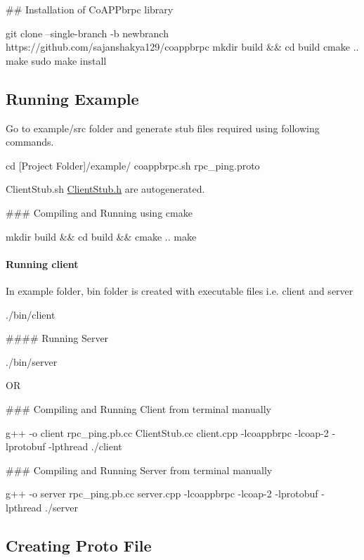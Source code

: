 \#\# Installation of Co\+A\+P\+Pbrpc library 
\begin{DoxyCode}
git clone --single-branch -b newbranch https://github.com/sajanshakya129/coappbrpc
mkdir build && cd build
cmake ..
make
sudo make install
\end{DoxyCode}


\subsection*{Running Example}

Go to example/src folder and generate stub files required using following commands. 
\begin{DoxyCode}
cd [Project Folder]/example/
coappbrpc.sh rpc\_ping.proto
\end{DoxyCode}
 Client\+Stub.\+sh \hyperlink{ClientStub_8h_source}{Client\+Stub.\+h} are autogenerated.

\#\#\# Compiling and Running using cmake 
\begin{DoxyCode}
mkdir build && cd build && cmake ..
make
\end{DoxyCode}
 \paragraph*{Running client}

In example folder, bin folder is created with executable files i.\+e. client and server 
\begin{DoxyCode}
./bin/client
\end{DoxyCode}
 \#\#\#\# Running Server 
\begin{DoxyCode}
./bin/server
\end{DoxyCode}
 OR

\#\#\# Compiling and Running Client from terminal manually 
\begin{DoxyCode}
g++ -o client rpc\_ping.pb.cc ClientStub.cc client.cpp -lcoappbrpc -lcoap-2 -lprotobuf -lpthread
./client
\end{DoxyCode}
 \#\#\# Compiling and Running Server from terminal manually 
\begin{DoxyCode}
g++ -o server rpc\_ping.pb.cc server.cpp -lcoappbrpc -lcoap-2 -lprotobuf -lpthread
./server
\end{DoxyCode}


\subsection*{Creating Proto File}

